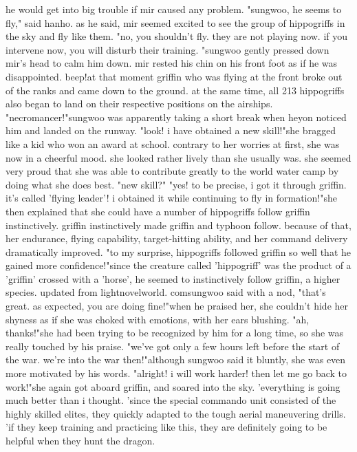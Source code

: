  he would get into big trouble if mir caused any problem.
"sungwoo, he seems to fly," said hanho.
as he said, mir seemed excited to see the group of hippogriffs in the sky and fly like them.
"no, you shouldn't fly.
 they are not playing now.
 if you intervene now, you will disturb their training.
"sungwoo gently pressed down mir's head to calm him down.
mir rested his chin on his front foot as if he was disappointed.
beep!at that moment griffin who was flying at the front broke out of the ranks and came down to the ground.
 at the same time, all 213 hippogriffs also began to land on their respective positions on the airships.
"necromancer!"sungwoo was apparently taking a short break when heyon noticed him and landed on the runway.
"look! i have obtained a new skill!"she bragged like a kid who won an award at school.
 contrary to her worries at first, she was now in a cheerful mood.
 she looked rather lively than she usually was.
she seemed very proud that she was able to contribute greatly to the world water camp by doing what she does best.
"new skill?"
"yes! to be precise, i got it through griffin.
 it's called 'flying leader'! i obtained it while continuing to fly in formation!"she then explained that she could have a number of hippogriffs follow griffin instinctively.
griffin instinctively made griffin and typhoon follow.
because of that, her endurance, flying capability, target-hitting ability, and her command delivery dramatically improved.
"to my surprise, hippogriffs followed griffin so well that he gained more confidence!"since the creature called 'hippogriff' was the product of a 'griffin' crossed with a 'horse', he seemed to instinctively follow griffin, a higher species.
updated from lightnov‌elworld.
c‌omsungwoo said with a nod, "that's great.
 as expected, you are doing fine!"when he praised her, she couldn't hide her shyness as if she was choked with emotions, with her ears blushing.
"ah, thanks!"she had been trying to be recognized by him for a long time, so she was really touched by his praise.
"we've got only a few hours left before the start of the war.
 we're into the war then!"although sungwoo said it bluntly, she was even more motivated by his words.
"alright! i will work harder! then let me go back to work!"she again got aboard griffin, and soared into the sky.
'everything is going much better than i thought.
'since the special commando unit consisted of the highly skilled elites, they quickly adapted to the tough aerial maneuvering drills.
'if they keep training and practicing like this, they are definitely going to be helpful when they hunt the dragon.
